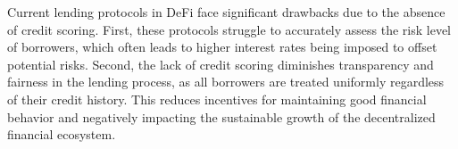 \documentclass[runningheads]{llncs}
\begin{document}


Current lending protocols in DeFi face significant drawbacks due to the absence of credit scoring. First, these protocols struggle to accurately assess the risk level of borrowers, which often leads to higher interest rates being imposed to offset potential risks.
Second, the lack of credit scoring diminishes transparency and fairness in the lending process, as all borrowers are treated uniformly regardless of their credit history. This reduces incentives for maintaining good financial behavior and negatively impacting the sustainable growth of the decentralized financial ecosystem.






\end{document}
